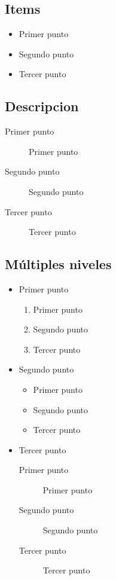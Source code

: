         \subsection{Items}
        
            \begin{itemize}
                \item Primer punto
                \item Segundo punto
                \item Tercer punto
            \end{itemize}
        
        \subsection{Descripcion}
        
            \begin{description}
                \item[Primer punto] Primer punto
                \item[Segundo punto] Segundo punto
                \item[Tercer punto] \nextLine
                    Tercer punto
            \end{description}
        
        \subsection{Múltiples niveles}
        
            \begin{itemize}
                \item Primer punto
                \begin{enumerate}
                    \item Primer punto
                    \item Segundo punto
                    \item Tercer punto
                \end{enumerate}
                
                \item Segundo punto
                \begin{itemize}
                    \item Primer punto
                    \item Segundo punto
                    \item Tercer punto
                \end{itemize}
                \item Tercer punto
                \begin{description}
                    \item[Primer punto] Primer punto
                    \item[Segundo punto] Segundo punto
                    \item[Tercer punto] \nextLine 
                        Tercer punto
                \end{description}
            \end{itemize}